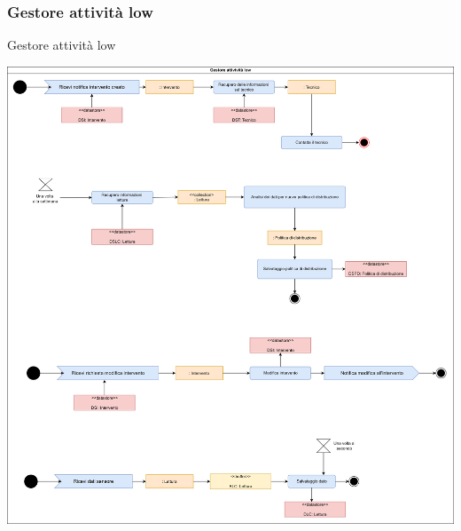 \documentclass{beamer}
\begin{document}
	\begin{frame}
		\subsubsection{Gestore attività low}	
		\begin{block}{Gestore attività low}
			\begin{center}
				\includegraphics[width=\textwidth, height=0.85\textheight, keepaspectratio=true]{comp5.png}
			\end{center}
		\end{block}
	\end{frame}	
	
\end{document}
